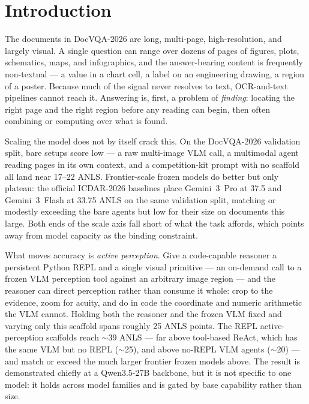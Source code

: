 \section{Introduction}

The documents in DocVQA-2026 are long, multi-page, high-resolution, and largely visual. A single question can range over dozens of pages of figures, plots, schematics, maps, and infographics, and the answer-bearing content is frequently non-textual --- a value in a chart cell, a label on an engineering drawing, a region of a poster. Because much of the signal never resolves to text, OCR-and-text pipelines cannot reach it. Answering is, first, a problem of \emph{finding}: locating the right page and the right region before any reading can begin, then often combining or computing over what is found.

Scaling the model does not by itself crack this. On the DocVQA-2026 validation split, bare setups score low --- a raw multi-image VLM call, a multimodal agent reading pages in its own context, and a competition-kit prompt with no scaffold all land near 17--22 ANLS. Frontier-scale frozen models do better but only plateau: the official ICDAR-2026 baselines place Gemini~3~Pro at 37.5 and Gemini~3~Flash at 33.75 ANLS on the same validation split, matching or modestly exceeding the bare agents but low for their size on documents this large. Both ends of the scale axis fall short of what the task affords, which points away from model capacity as the binding constraint.

What moves accuracy is \emph{active perception}. Give a code-capable reasoner a persistent Python REPL and a single visual primitive --- an on-demand call to a frozen VLM perception tool against an arbitrary image region --- and the reasoner can direct perception rather than consume it whole: crop to the evidence, zoom for acuity, and do in code the coordinate and numeric arithmetic the VLM cannot. Holding both the reasoner and the frozen VLM fixed and varying only this scaffold spans roughly 25 ANLS points. The REPL active-perception scaffolds reach $\sim$39 ANLS --- far above tool-based ReAct, which has the same VLM but no REPL ($\sim$25), and above no-REPL VLM agents ($\sim$20) --- and match or exceed the much larger frontier frozen models above. The result is demonstrated chiefly at a Qwen3.5-27B backbone, but it is not specific to one model: it holds across model families and is gated by base capability rather than size.

